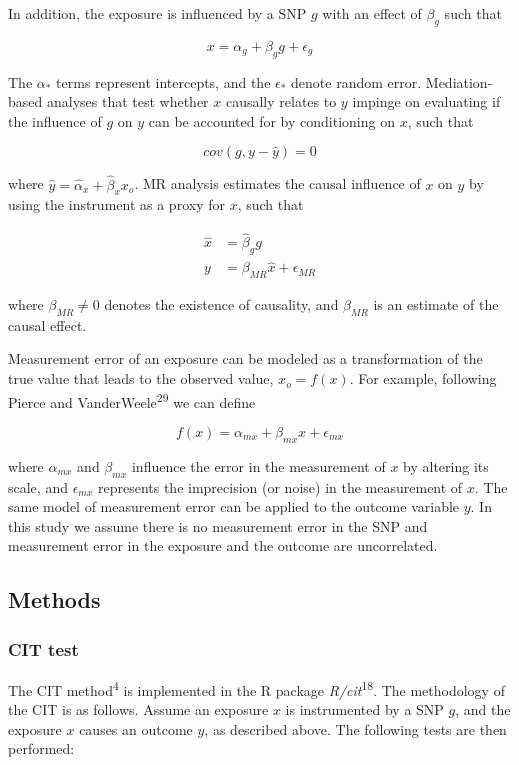 \documentclass[]{article}
\begin{document}
In addition, the exposure is influenced by a SNP \(g\) with an effect of
\(\beta_g\) such that

\[
x = \alpha_g + \beta_g g + \epsilon_g
\]

The \(\alpha_*\) terms represent intercepts, and the \(\epsilon_*\)
denote random error. Mediation-based analyses that test whether \(x\)
causally relates to \(y\) impinge on evaluating if the influence of
\(g\) on \(y\) can be accounted for by conditioning on \(x\), such that

\[
cov(g, y - \hat{y}) = 0
\]

where \(\hat{y} = \hat{\alpha}_x + \hat{\beta}_x x_o\). MR analysis
estimates the causal influence of \(x\) on \(y\) by using the instrument
as a proxy for \(x\), such that

\[
\begin{aligned}
\hat{x} & = \hat{\beta}_g g \\
y & = \beta_{MR}\hat{x} + \epsilon_{MR}
\end{aligned}
\]

where \(\beta_{MR} \neq 0\) denotes the existence of causality, and
\(\beta_{MR}\) is an estimate of the causal effect.

Measurement error of an exposure can be modeled as a transformation of
the true value that leads to the observed value, \(x_o = f(x)\). For
example, following Pierce and VanderWeele\textsuperscript{29} we can
define

\[
f(x) = \alpha_{mx} + \beta_{mx} x + \epsilon_{mx}
\]

where \(\alpha_{mx}\) and \(\beta_{mx}\) influence the error in the
measurement of \(x\) by altering its scale, and \(\epsilon_{mx}\)
represents the imprecision (or noise) in the measurement of \(x\). The
same model of measurement error can be applied to the outcome variable
\(y\). In this study we assume there is no measurement error in the SNP
and measurement error in the exposure and the outcome are uncorrelated.

\subsection{Methods}\label{methods}

\subsubsection{CIT test}\label{cit-test}

The CIT method\textsuperscript{4} is implemented in the R package
\emph{R/cit}\textsuperscript{18}. The methodology of the CIT is as
follows. Assume an exposure \(x\) is instrumented by a SNP \(g\), and
the exposure \(x\) causes an outcome \(y\), as described above. The
following tests are then performed:
\end{document}
